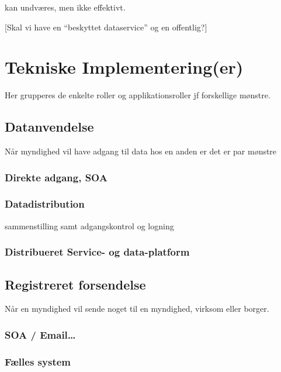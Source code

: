 kan undværes, men ikke effektivt.

{[}Skal vi have en ``beskyttet dataservice'' og en offentlig?{]}

\section{Tekniske Implementering(er)}\label{tekniske-implementeringer}

Her grupperes de enkelte roller og applikationsroller jf forskellige
mønstre.

\subsection{Datanvendelse}\label{datanvendelse}

Når myndighed vil have adgang til data hos en anden er det er par
mønstre

\subsubsection{Direkte adgang, SOA}\label{direkte-adgang-soa}

\subsubsection{Datadistribution}\label{datadistribution}

sammenstilling samt adgangskontrol og logning

\subsubsection{Distribueret Service- og
data-platform}\label{distribueret-service--og-data-platform}

\subsection{Registreret forsendelse}\label{registreret-forsendelse}

Når en myndighed vil sende noget til en myndighed, virksom eller borger.

\subsubsection{SOA / Email\ldots{}}\label{soa-email}

\subsubsection{Fælles system}\label{fuxe6lles-system}

